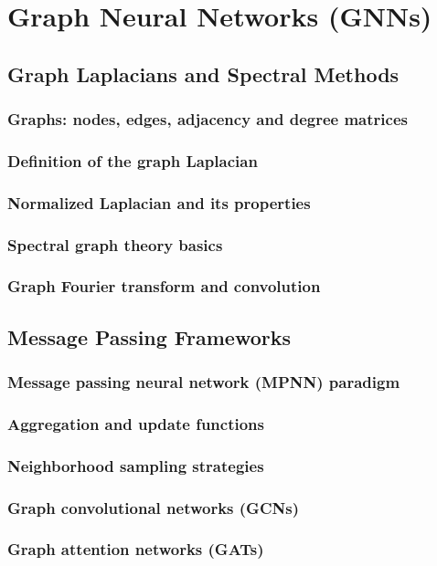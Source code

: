 ﻿\chapter{Graph Neural Networks (GNNs)}

\section{Graph Laplacians and Spectral Methods}
\subsection{Graphs: nodes, edges, adjacency and degree matrices}
\subsection{Definition of the graph Laplacian}
\subsection{Normalized Laplacian and its properties}
\subsection{Spectral graph theory basics}
\subsection{Graph Fourier transform and convolution}

\section{Message Passing Frameworks}
\subsection{Message passing neural network (MPNN) paradigm}
\subsection{Aggregation and update functions}
\subsection{Neighborhood sampling strategies}
\subsection{Graph convolutional networks (GCNs)}
\subsection{Graph attention networks (GATs)}

